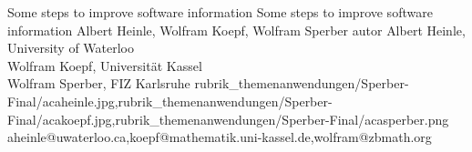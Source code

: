 \documentclass[a4paper,11pt]{article}
\begin{document}




%
%


\Aufsatz
{Some steps to improve software information}
{Some steps to improve software information}
{Albert Heinle,  Wolfram Koepf, Wolfram Sperber}
{autor}
 {Albert Heinle, University of Waterloo \\
  Wolfram Koepf, Universit\"at Kassel \\
  Wolfram Sperber, FIZ Karlsruhe}
{rubrik_themenanwendungen/Sperber-Final/acaheinle.jpg,rubrik_themenanwendungen/Sperber-Final/acakoepf.jpg,rubrik_themenanwendungen/Sperber-Final/acasperber.png}
{aheinle@uwaterloo.ca,koepf@mathematik.uni-kassel.de,wolfram@zbmath.org}



\vspace{3mm}
\end{document}
